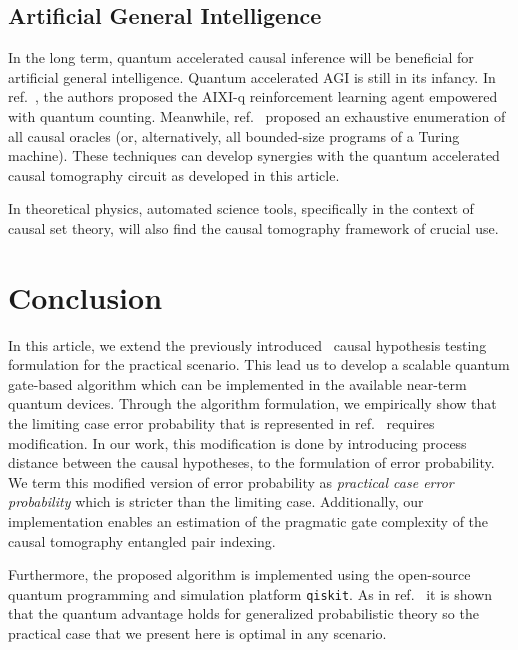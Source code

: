 \documentclass[%
 aps,
 jmp,%
 amsmath,amssymb,
 reprint,%
]{revtex4-2}
\begin{document}

\subsection{Artificial General Intelligence}

In the long term, quantum accelerated causal inference will be beneficial for artificial general intelligence.
Quantum accelerated AGI is still in its infancy. In ref.~\cite{catt2020gentle}, the authors proposed the AIXI-q reinforcement learning agent empowered with quantum counting. Meanwhile, ref.~\cite{sarkar2021estimating} proposed an exhaustive enumeration of all causal oracles (or, alternatively, all bounded-size programs of a Turing machine).
These techniques can develop synergies with the quantum accelerated causal tomography circuit as developed in this article.

In theoretical physics, automated science tools, specifically in the context of causal set theory, will also find the causal tomography framework of crucial use. 

\section{Conclusion} \label{sec:conclusion}

In this article, we extend the previously introduced~\cite{chiribella2019quantum} causal hypothesis testing formulation for the practical scenario. This lead us to develop a scalable quantum gate-based algorithm which can be implemented in the available near-term quantum devices. Through the algorithm formulation, we empirically show that the limiting case error probability that is represented in ref.~\cite{chiribella2019quantum} requires modification. In our work, this modification is done by introducing process distance between the causal hypotheses, to the formulation of error probability. We term this modified version of error probability as \textit{practical case error probability} which is stricter than the limiting case. Additionally, our implementation enables an estimation of the pragmatic gate complexity of the causal tomography entangled pair indexing.

Furthermore, the proposed algorithm is implemented using the open-source quantum programming and simulation platform \texttt{qiskit}. As in ref.~\cite{chiribella2019quantum} it is shown that the quantum advantage holds for generalized probabilistic theory so the practical case that we present here is optimal in any scenario.
\end{document}
